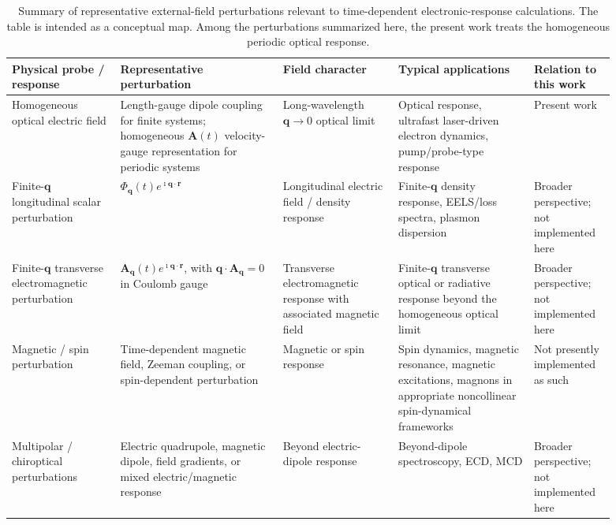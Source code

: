 \begin{table}[h!]
\scriptsize
\setlength{\tabcolsep}{3pt}
\caption{Summary of representative external-field perturbations relevant
to time-dependent electronic-response calculations.  The table is
intended as a conceptual map.  Among the perturbations summarized here,
the present work treats the homogeneous periodic optical response.}
\label{tab:external-field-map}
\centering
\begin{tabular}{@{}p{0.16\linewidth}p{0.24\linewidth}p{0.17\linewidth}p{0.20\linewidth}p{0.12\linewidth}@{}}
\hline
Physical probe / response
& Representative perturbation
& Field character
& Typical applications
& Relation to this work \\
\hline
Homogeneous optical electric field
& Length-gauge dipole coupling for finite systems; homogeneous
  $\mathbf A(t)$ velocity-gauge representation for periodic systems
& Long-wavelength $\mathbf q\rightarrow0$ optical limit
& Optical response, ultrafast laser-driven electron dynamics,
  pump/probe-type response
& Present work \\[0.6em]
Finite-$\mathbf q$ longitudinal scalar perturbation
& $\Phi_{\mathbf q}(t)e^{\imath\mathbf q\cdot\mathbf r}$
& Longitudinal electric field / density response
& Finite-$\mathbf q$ density response, EELS/loss spectra,
  plasmon dispersion
& Broader perspective; not implemented here \\[0.6em]
Finite-$\mathbf q$ transverse electromagnetic perturbation
& $\mathbf A_{\mathbf q}(t)e^{\imath\mathbf q\cdot\mathbf r}$,
  with $\mathbf q\cdot\mathbf A_{\mathbf q}=0$ in Coulomb gauge
& Transverse electromagnetic response with associated magnetic field
& Finite-$\mathbf q$ transverse optical or radiative response beyond
  the homogeneous optical limit
& Broader perspective; not implemented here \\[0.6em]
Magnetic / spin perturbation
& Time-dependent magnetic field, Zeeman coupling, or spin-dependent
  perturbation
& Magnetic or spin response
& Spin dynamics, magnetic resonance, magnetic excitations, magnons in
  appropriate noncollinear spin-dynamical frameworks
& Not presently implemented as such \\[0.6em]
Multipolar / chiroptical perturbations
& Electric quadrupole, magnetic dipole, field gradients, or mixed
  electric/magnetic response
& Beyond electric-dipole response
& Beyond-dipole spectroscopy, ECD, MCD
& Broader perspective; not implemented here \\
\hline
\end{tabular}
\end{table}

